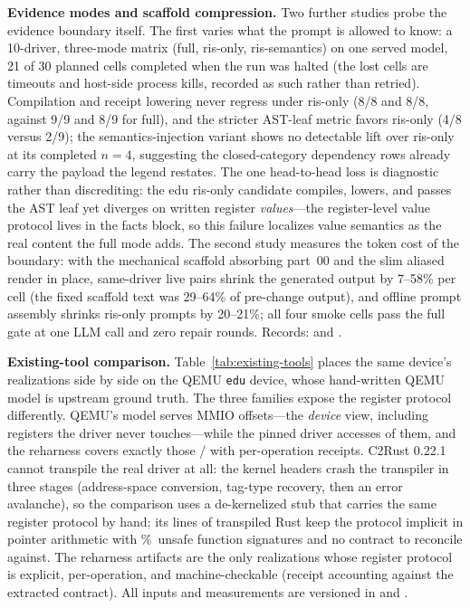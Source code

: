 \textbf{Evidence modes and scaffold compression.} Two further studies probe
the evidence boundary itself. The first varies what the prompt is allowed to
know: a 10-driver, three-mode matrix (full, ris-only, ris-semantics) on one
served model, 21 of 30 planned cells completed when the run was halted (the
lost cells are timeouts and host-side process kills, recorded as such rather
than retried). Compilation and receipt lowering never regress under ris-only
(8/8 and 8/8, against 9/9 and 8/9 for full), and the stricter AST-leaf
metric favors ris-only (4/8 versus 2/9); the semantics-injection variant
shows no detectable lift over ris-only at its completed $n{=}4$, suggesting
the closed-category dependency rows already carry the payload the legend
restates. The one head-to-head loss is diagnostic rather than discrediting:
the edu ris-only candidate compiles, lowers, and passes the AST leaf yet
diverges on written register \emph{values}---the register-level value
protocol lives in the facts block, so this failure localizes value
semantics as the real content the full mode adds. The second study measures
the token cost of the boundary: with the mechanical scaffold absorbing
part~00 and the slim aliased \rislang{} render in place, same-driver live
pairs shrink the generated output by 7--58\% per cell (the fixed scaffold
text was 29--64\% of pre-change output), and offline prompt assembly
shrinks ris-only prompts by 20--21\%; all four smoke cells pass the full
gate at one LLM call and zero repair rounds. Records:
 and
.

\textbf{Existing-tool comparison.} Table~\ref{tab:existing-tools} places
the same device's realizations side by side on the QEMU \texttt{edu}
device, whose hand-written QEMU model is upstream ground truth. The three
families expose the register protocol differently. QEMU's model serves
\ExtQemuMmioOffsets{} MMIO offsets---the \emph{device} view, including
registers the driver never touches---while the pinned driver accesses
\ExtDriverOffsets{} of them, and the reharness \rislang{} covers exactly
those \ExtDriverOffsets{}/\ExtDriverOffsets{} with per-operation receipts.
C2Rust 0.22.1 cannot transpile the real driver at all: the kernel headers
crash the transpiler in three stages (address-space conversion, tag-type
recovery, then an error avalanche), so the comparison uses a de-kernelized
stub that carries the same register protocol by hand; its \ExtTranspileLines{}
lines of transpiled Rust keep the protocol implicit in pointer arithmetic
with \ExtTranspileUnsafePct\%\ unsafe function signatures and no contract to
reconcile against. The reharness artifacts are the only realizations whose
register protocol is explicit, per-operation, and machine-checkable
(receipt accounting against the extracted contract). All inputs and
measurements are versioned in
 and
.

